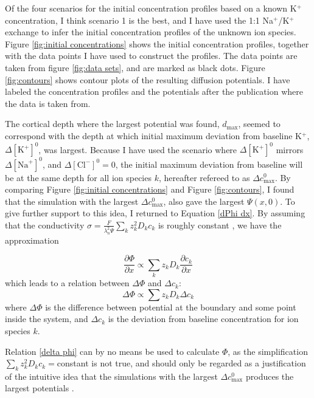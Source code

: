 \documentclass{uiophd}
\begin{document}
Of the four scenarios for the initial concentration profiles based on a known K$^+$ concentration, I think scenario 1 is the best, and I have used the 1:1 Na$^+$/K$^+$ exchange to infer the initial concentration profiles of the unknown ion species. Figure \ref{fig:initial concentrations} shows the initial concentration profiles, together with the data points I have used to construct the profiles. The data points are taken from figure \ref{fig:data sets}, and are marked as black dots. Figure \ref{fig:contours} shows contour plots of the resulting diffusion potentials. I have labeled the concentration profiles and the potentials after the publication where the data is taken from. 

The cortical depth where the largest potential was found, $d_{\text{max}}$, seemed to correspond with the depth at which initial maximum deviation from baseline K$^+$, $\Delta[\text{K}^+]^0$, was largest. Because I have used the scenario where $\Delta [\text{K}^+]^0$ mirrors $\Delta [\text{Na}^+]^0$, and $\Delta [\text{Cl}^-]^0 =0$, the initial maximum deviation from baseline will be at the same depth for all ion species $k$, hereafter refereed to as $\Delta c_{\text{max}}^0$. By comparing Figure \ref{fig:initial concentrations} and Figure \ref{fig:contours}, I found that the simulation with the largest  $\Delta c_{\text{max}}^0$, also gave the largest $\Psi(x,0)$. To give further support to this idea, I returned to Equation \ref{dPhi dx}. By assuming that the conductivity $\sigma = \frac{F}{\lambda_n^2 \Psi}\sum_k z_k^2D_kc_k$ is roughly constant \cite{Halnes2016}, we have the approximation

\begin{equation}
 \frac{\partial \Phi}{\partial x}  \propto { \sum_k z_k D_k \frac{\partial c_k}{\partial x} }
\end{equation}
which leads to a relation between $\Delta \Phi$ and $\Delta c_k$:
\begin{equation}\label{delta phi}
 \Delta \Phi \propto \sum z_k D_k \Delta c_k
\end{equation}
where $\Delta \Phi $ is the difference between potential at the boundary and some point inside the system, and $\Delta c_k $ is the deviation from baseline concentration for ion species $k$.



Relation \ref{delta phi} can by no means be used to calculate $\Phi$, as the simplification $\sum_k z_k^2 D_k c_k =$constant is not true, and should only be regarded as a justification of the intuitive idea that the simulations with the largest $\Delta c_{\text{max}}^0$ produces the largest potentials . 
\end{document}

